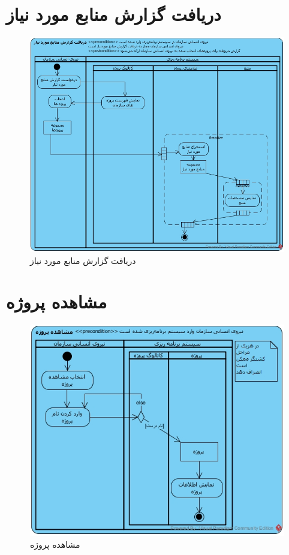 \section{دریافت گزارش منابع مورد نیاز}
\begin{figure}[H]
	\centering
	\includegraphics[scale=0.6]{img/activity/RequiredResourcesReport}
	\caption{دریافت گزارش منابع مورد نیاز}
\end{figure}

\section{مشاهده پروژه}
\begin{figure}[H]
	\centering
	\includegraphics[scale=0.8]{img/activity/ViewProject}
	\caption{مشاهده پروژه}
\end{figure}


